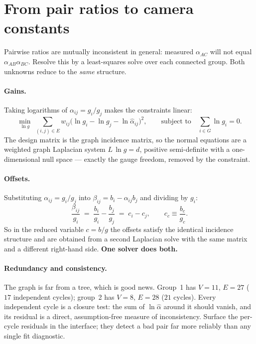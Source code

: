 \documentclass[11pt,a4paper]{article}
\newcommand{\gain}{g}
\newcommand{\off}{b}
\begin{document}
\section{From pair ratios to camera constants}
\label{sec:network}

Pairwise ratios are mutually inconsistent in general: measured $\alpha_{AC}$
will not equal $\alpha_{AB}\alpha_{BC}$. Resolve this by a least-squares solve
over each connected group. Both unknowns reduce to the \emph{same} structure.

\paragraph{Gains.} Taking logarithms of $\alpha_{ij}=\gain_i/\gain_j$ makes the
constraints linear:
\begin{equation}
  \min_{\ln \gain}\;\sum_{(i,j)\in E} w_{ij}\bigl(\ln \gain_i-\ln \gain_j-\ln\hat\alpha_{ij}\bigr)^2,
  \qquad \text{subject to}\quad \sum_{i\in G}\ln \gain_i=0 .
  \label{eq:gainsolve}
\end{equation}
The design matrix is the graph incidence matrix, so the normal equations are a
weighted graph Laplacian system $L\,\ln \gain = d$, positive semi-definite with a
one-dimensional null space --- exactly the gauge freedom, removed by the
constraint.

\paragraph{Offsets.} Substituting $\alpha_{ij}=\gain_i/\gain_j$ into
$\beta_{ij}=\off_i-\alpha_{ij}\off_j$ and dividing by $\gain_i$:
\begin{equation}
  \frac{\beta_{ij}}{\gain_i}
  \;=\; \frac{\off_i}{\gain_i}-\frac{\off_j}{\gain_j}
  \;=\; c_i-c_j,
  \qquad c_c\equiv\frac{\off_c}{\gain_c}.
\end{equation}
So in the reduced variable $c=\off/\gain$ the offsets satisfy the identical
incidence structure and are obtained from a second Laplacian solve with the same
matrix and a different right-hand side. \textbf{One solver does both.}

\paragraph{Redundancy and consistency.} The graph is far from a tree, which is
good news. Group~1 has $V=11$, $E=27$ ($17$ independent cycles); group~2 has
$V=8$, $E=28$ ($21$ cycles). Every independent cycle is a closure test: the sum
of $\ln\hat\alpha$ around it should vanish, and its residual is a direct,
assumption-free measure of inconsistency. Surface the per-cycle residuals in the
interface; they detect a bad pair far more reliably than any single fit
diagnostic.
\end{document}
